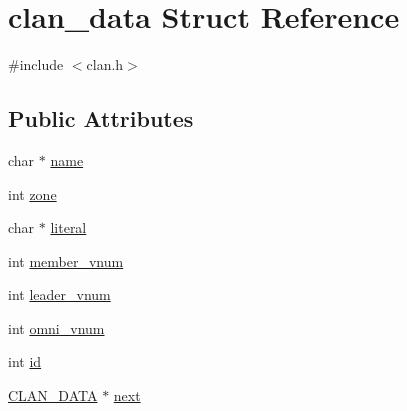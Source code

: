 \hypertarget{structclan__data}{\section{clan\-\_\-data Struct Reference}
\label{structclan__data}
}


{\ttfamily \#include $<$clan.\-h$>$}

\subsection*{Public Attributes}
\begin{DoxyCompactItemize}
\item 
char $\ast$ \hyperlink{structclan__data_ab1a1db6e6b58d24b2aa0916a177ef706}{name}
\item 
int \hyperlink{structclan__data_a776801bc7444a9e38f4f9b7b6e9dd43a}{zone}
\item 
char $\ast$ \hyperlink{structclan__data_a66471538c5978cdb076e6fe5eb7e2bfd}{literal}
\item 
int \hyperlink{structclan__data_aad70d793cc6fab90c51c7882e39ba00b}{member\-\_\-vnum}
\item 
int \hyperlink{structclan__data_af548b9a27c379c410a43808c846f959a}{leader\-\_\-vnum}
\item 
int \hyperlink{structclan__data_a022cca2ea2c9cf355b2abf604c8f5db7}{omni\-\_\-vnum}
\item 
int \hyperlink{structclan__data_a893475695eea4959052449783d2365cf}{id}
\item 
\hyperlink{clan_8h_a7cdc2f1c9b4cc99d0cbd70a2c1d9b246}{C\-L\-A\-N\-\_\-\-D\-A\-T\-A} $\ast$ \hyperlink{structclan__data_a5e5e8b39a00ecd7634bf12da626dd0e0}{next}
\end{DoxyCompactItemize}



